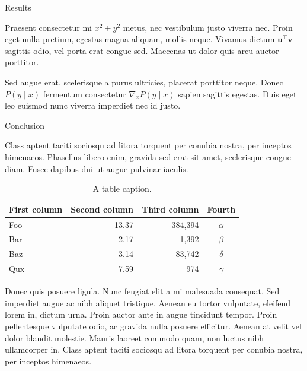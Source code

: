 \documentclass[final]{beamer}
\newlength{\colwidth}
\begin{document}
\begin{frame}[t]
\begin{columns}[t]
\begin{column}{\colwidth}
\begin{block}{Results}
				
				Praesent consectetur mi $x^2 + y^2$ metus, nec vestibulum justo viverra
				nec. Proin eget nulla pretium, egestas magna aliquam, mollis neque. Vivamus
				dictum $\mathbf{u}^\intercal\mathbf{v}$ sagittis odio, vel porta erat
				congue sed. Maecenas ut dolor quis arcu auctor porttitor.
				
				
				Sed augue erat, scelerisque a purus ultricies, placerat porttitor neque.
				Donec $P(y \mid x)$ fermentum consectetur $\nabla_x P(y \mid x)$ sapien
				sagittis egestas. Duis eget leo euismod nunc viverra imperdiet nec id
				justo.
				
			\end{block}
			
			\begin{block}{Conclusion}
				
				Class aptent taciti sociosqu ad litora torquent per conubia nostra, per
				inceptos himenaeos. Phasellus libero enim, gravida sed erat sit amet,
				scelerisque congue diam. Fusce dapibus dui ut augue pulvinar iaculis.
				
				\begin{table}
					\centering
					\begin{tabular}{l r r c}
						\toprule
						\textbf{First column} & \textbf{Second column} & \textbf{Third column} & \textbf{Fourth} \\
						\midrule
						Foo & 13.37 & 384,394 & $\alpha$ \\
						Bar & 2.17 & 1,392 & $\beta$ \\
						Baz & 3.14 & 83,742 & $\delta$ \\
						Qux & 7.59 & 974 & $\gamma$ \\
						\bottomrule
					\end{tabular}
					\caption{A table caption.}
				\end{table}
				
				Donec quis posuere ligula. Nunc feugiat elit a mi malesuada consequat. Sed
				imperdiet augue ac nibh aliquet tristique. Aenean eu tortor vulputate,
				eleifend lorem in, dictum urna. Proin auctor ante in augue tincidunt
				tempor. Proin pellentesque vulputate odio, ac gravida nulla posuere
				efficitur. Aenean at velit vel dolor blandit molestie. Mauris laoreet
				commodo quam, non luctus nibh ullamcorper in. Class aptent taciti sociosqu
				ad litora torquent per conubia nostra, per inceptos himenaeos.
				

\end{block}
\end{column}
\end{columns}
\end{frame}
\end{document}
